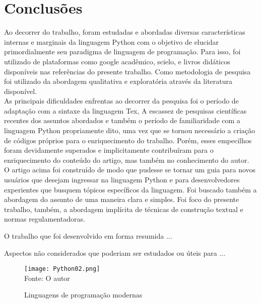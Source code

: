 

\chapter{Conclus\~{o}es}

Ao decorrer do trabalho, foram estudadas e abordadas diversas características internas e marginais da linguagem Python com o objetivo de elucidar primordialmente seu paradigma de linguagem de programação. Para isso, foi utilizado de plataformas como google acadêmico, scielo, e livros didáticos disponíveis nas referências do presente trabalho. Como metodologia de pesquisa foi utilizado da abordagem qualitativa e exploratória através da literatura disponível.\\
As principais dificuldades enfrentas ao decorrer da pesquisa foi o período de adaptação com a sintaxe da linguagem Tex, A escassez de pesquisas científicas recentes dos assuntos abordados e também o período de familiaridade com a linguagem Python propriamente dito, uma vez que se tornou necessário a criação de códigos próprios para o enriquecimento do trabalho. Porém, esses empecilhos foram devidamente superados e implicitamente contribuíram para o enriquecimento do conteúdo do artigo, mas também no conhecimento do autor.\\
O artigo acima foi construído de modo que pudesse se tornar um guia para novos usuários que desejam ingressar na linguagem Python e para desenvolvedores experientes que busquem tópicos específicos da linguagem. Foi buscado também a abordagem do assunto de uma maneira clara e simples. Foi foco do presente trabalho, também, a abordagem implícita de técnicas de construção textual e normas regulamentadoras.



O trabalho que foi desenvolvido em forma resumida ...

Aspectos n\~{a}o considerados que poderiam ser estudados ou \'{u}teis para ...



   \begin{figure}[H]
    \begin{center}
        \caption{Linguagens de programa\c{c}\~{a}o modernas} \label{ling2}
        \texttt{[image: Python02.png]} \\
        {\tiny \sf Fonte: O autor }
    \end{center}
   \end{figure} 